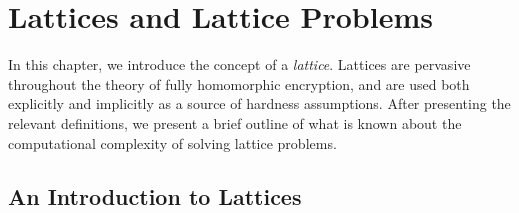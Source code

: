 \chapter{Lattices and Lattice Problems} \label{chap: latticechap}

In this chapter, we introduce the concept of a \emph{lattice}. Lattices are pervasive throughout the theory of fully homomorphic encryption, and are used both explicitly and implicitly as a source of hardness assumptions. After presenting the relevant definitions, we present a brief outline of what is known about the computational complexity of solving lattice problems.



\section{An Introduction to Lattices}
\label{sec:lattice}
